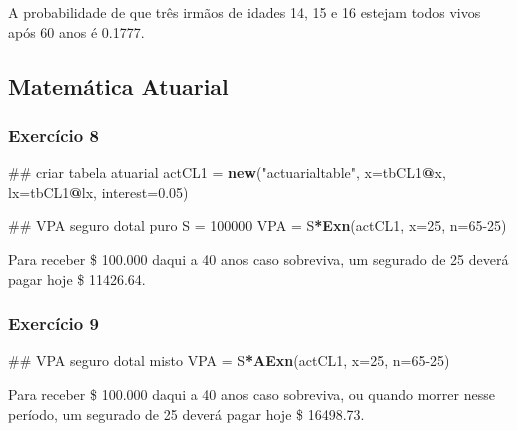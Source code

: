 \documentclass[]{article}
\newenvironment{Shaded}{\begin{snugshade}}{\end{snugshade}}
\newcommand{\DataTypeTok}[1]{\textcolor[rgb]{0.13,0.29,0.53}{#1}}
\newcommand{\DecValTok}[1]{\textcolor[rgb]{0.00,0.00,0.81}{#1}}
\newcommand{\FloatTok}[1]{\textcolor[rgb]{0.00,0.00,0.81}{#1}}
\newcommand{\KeywordTok}[1]{\textcolor[rgb]{0.13,0.29,0.53}{\textbf{#1}}}
\newcommand{\NormalTok}[1]{#1}
\newcommand{\OperatorTok}[1]{\textcolor[rgb]{0.81,0.36,0.00}{\textbf{#1}}}
\newcommand{\StringTok}[1]{\textcolor[rgb]{0.31,0.60,0.02}{#1}}
\begin{document}
A probabilidade de que três irmãos de idades 14, 15 e 16 estejam todos
vivos após 60 anos é 0.1777.

\hypertarget{matematica-atuarial}{%
\subsection{Matemática Atuarial}\label{matematica-atuarial}}

\hypertarget{exercicio-8}{%
\subsubsection{Exercício 8}\label{exercicio-8}}

\begin{Shaded}
\begin{Highlighting}[]
\NormalTok{## criar tabela atuarial}
\NormalTok{actCL1 =}\StringTok{ }\KeywordTok{new}\NormalTok{(}\StringTok{"actuarialtable"}\NormalTok{, }\DataTypeTok{x=}\NormalTok{tbCL1}\OperatorTok{@}\NormalTok{x, }\DataTypeTok{lx=}\NormalTok{tbCL1}\OperatorTok{@}\NormalTok{lx, }\DataTypeTok{interest=}\FloatTok{0.05}\NormalTok{)}

\NormalTok{## VPA seguro dotal puro}
\NormalTok{S =}\StringTok{ }\DecValTok{100000}
\NormalTok{VPA =}\StringTok{ }\NormalTok{S}\OperatorTok{*}\KeywordTok{Exn}\NormalTok{(actCL1, }\DataTypeTok{x=}\DecValTok{25}\NormalTok{, }\DataTypeTok{n=}\DecValTok{65-25}\NormalTok{)}
\end{Highlighting}
\end{Shaded}

Para receber \$ 100.000 daqui a 40 anos caso sobreviva, um segurado de
25 deverá pagar hoje \$ 11426.64.

\hypertarget{exercicio-9}{%
\subsubsection{Exercício 9}\label{exercicio-9}}

\begin{Shaded}
\begin{Highlighting}[]
\NormalTok{## VPA seguro dotal misto}
\NormalTok{VPA =}\StringTok{ }\NormalTok{S}\OperatorTok{*}\KeywordTok{AExn}\NormalTok{(actCL1, }\DataTypeTok{x=}\DecValTok{25}\NormalTok{, }\DataTypeTok{n=}\DecValTok{65-25}\NormalTok{)}
\end{Highlighting}
\end{Shaded}

Para receber \$ 100.000 daqui a 40 anos caso sobreviva, ou quando morrer
nesse período, um segurado de 25 deverá pagar hoje \$ 16498.73.
\end{document}
